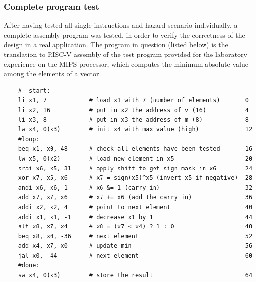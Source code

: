 \documentclass[a4paper]{article}
\begin{document}
\subsubsection{Complete program test}
After having tested all single instructions and hazard scenario individually, a complete assembly program was tested, in order to verify the correctness of the design in a real application. The program in question (listed below) is the translation to RISC-V assembly of the test program provided for the laboratory experience on the MIPS processor, which computes the minimum absolute value among the elements of a vector.
\begin{verbatim}
    #__start:
    li x1, 7            # load x1 with 7 (number of elements)       0
    li x2, 16           # put in x2 the address of v (16)           4
    li x3, 8            # put in x3 the address of m (8)            8
    lw x4, 0(x3)        # init x4 with max value (high)             12
    #loop:
    beq x1, x0, 48      # check all elements have been tested       16
    lw x5, 0(x2)        # load new element in x5                    20
    srai x6, x5, 31     # apply shift to get sign mask in x6        24
    xor x7, x5, x6      # x7 = sign(x5)^x5 (invert x5 if negative)  28
    andi x6, x6, 1      # x6 &= 1 (carry in)                        32
    add x7, x7, x6      # x7 += x6 (add the carry in)               36
    addi x2, x2, 4      # point to next element                     40
    addi x1, x1, -1     # decrease x1 by 1                          44
    slt x8, x7, x4      # x8 = (x7 < x4) ? 1 : 0                    48
    beq x8, x0, -36     # next element                              52
    add x4, x7, x0      # update min                                56
    jal x0, -44         # next element                              60    
    #done:
    sw x4, 0(x3)        # store the result                          64
\end{verbatim}




\end{document}
